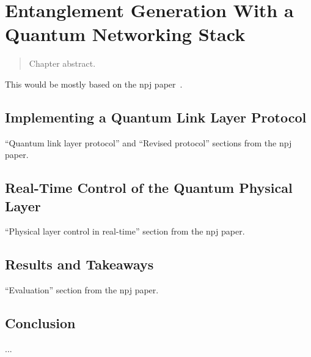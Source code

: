 \chapter{Entanglement Generation With a Quantum Networking Stack}
\label{chp:netstack}

\begin{refsection}

\begin{abstract}
Chapter abstract.
\end{abstract}


\newpage


\noindent
This would be mostly based on the npj paper~\cite{pompili_experimental_2022}.

\section{Implementing a Quantum Link Layer Protocol}

``Quantum link layer protocol'' and ``Revised protocol'' sections from the npj paper.

\section{Real-Time Control of the Quantum Physical Layer}

``Physical layer control in real-time'' section from the npj paper.

\section{Results and Takeaways}

``Evaluation'' section from the npj paper.

\section{Conclusion}

...

\printbibliography[heading=subbibintoc,title={References}]

\end{refsection}
